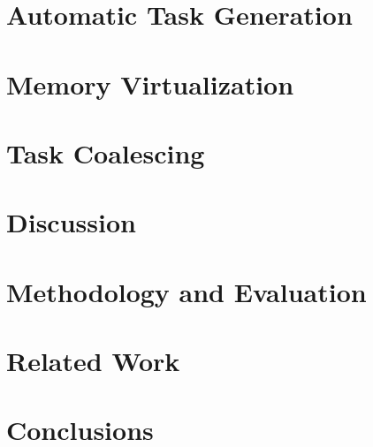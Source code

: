 \documentclass[pageno]{jpaper}
\begin{document}


\section{Automatic Task Generation}
\label{sec:compiler}





\section{Memory Virtualization}
\label{sec:memory_virtulaization}



\section{Task Coalescing}
\label{sec:task_coalescing}



\section{Discussion}
\label{sec:discussion}



\section{Methodology and Evaluation}
\label{sec:methodology_evaluation}



\section{Related Work}
\label{sec:related_work}



\section{Conclusions}
\label{sec:conclusions}



\newpage





\end{document}
